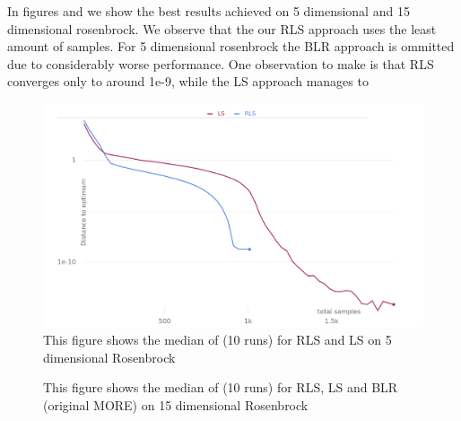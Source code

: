 In figures  and  we show the best results
achieved on 5 dimensional and 15 dimensional rosenbrock. We observe that
the our RLS approach uses the least amount of samples. For 5 dimensional
rosenbrock the BLR approach is ommitted due to considerably worse
performance.
One observation to make is that RLS converges only to around 1e-9, while
the LS approach manages to 
\begin{figure}[ht!]
     \centering
     \includegraphics[width=1\textwidth]{figures/5dim}
     \hspace{1cm}                       
     \caption{This figure shows the median of (10 runs) for RLS and LS on 5 dimensional Rosenbrock}
     \label{fig:5dim}
\end{figure}

\begin{figure}[ht!]
     \centering
     \hspace{1cm}                       
     \caption{This figure shows the median of (10 runs) for RLS, LS and BLR (original MORE) on 15 dimensional Rosenbrock}
     \label{fig:15dim}  
\end{figure}


